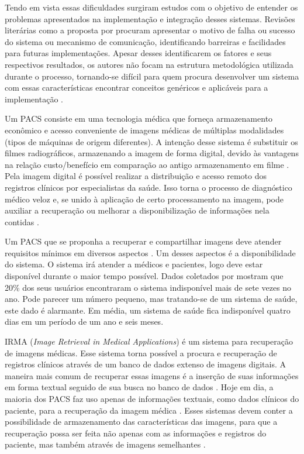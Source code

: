 Tendo em vista essas dificuldades surgiram estudos com o objetivo de entender os problemas apresentados na implementação e integração desses sistemas.
Revisões literárias como a proposta por \cite{REF02} procuram apresentar o motivo de falha ou sucesso do sistema ou mecanismo de comunicação, identificando barreiras e facilidades para futuras implementações.
Apesar desses identificarem os fatores e seus respectivos resultados, os autores não focam na estrutura metodológica utilizada durante o processo, tornando-se difícil para quem procura desenvolver um sistema com essas características encontrar conceitos genéricos e aplicáveis para a implementação \cite{REF09}.

Um PACS consiste em uma tecnologia médica que forneça armazenamento econômico e acesso conveniente de imagens médicas de múltiplas modalidades (tipos de máquinas de origem diferentes).
A intenção desse sistema é substituir os filmes radiográficos, armazenando a imagem de forma digital, devido às vantagens na relação custo/benefício em comparação ao antigo armazenamento em filme \cite{REF13}.
Pela imagem digital é possível realizar a distribuição e acesso remoto dos registros clínicos por especialistas da saúde.
Isso torna o processo de diagnóstico médico veloz e, se unido à aplicação de certo processamento na imagem, pode auxiliar a recuperação ou melhorar a disponibilização de informações nela contidas \cite{REF05}.

Um PACS que se proponha a recuperar e compartilhar imagens deve atender requisitos mínimos em diversos aspectos \cite{REF03}.
Um desses aspectos é a disponibilidade do sistema.
O sistema irá atender a médicos e pacientes, logo deve estar disponível durante o maior tempo possível.
Dados coletados por \cite{REF19} mostram que 20\% dos seus usuários encontraram o sistema indisponível mais de sete vezes no ano.
Pode parecer um número pequeno, mas tratando-se de um sistema de saúde, este dado é alarmante.
Em média, um sistema de saúde fica indisponível quatro dias em um período de um ano e seis meses.

IRMA (\textit{Image Retrieval in Medical Applications}) é um sistema para recuperação de imagens médicas. Esse sistema torna possível a procura e recuperação de registros clínicos através de um banco de dados extenso de imagens digitais.
A maneira mais comum de recuperar essas imagens é a inserção de suas informações em forma textual seguido de sua busca no banco de dados \cite{REF08}.
Hoje em dia, a maioria dos PACS faz uso apenas de informações textuais, como dados clínicos do paciente, para a recuperação da imagem médica \cite{REF04}.
Esses sistemas devem conter a possibilidade de armazenamento das características das imagens, para que a recuperação possa ser feita não apenas com as informações e registros do paciente, mas também através de imagens semelhantes \cite{REF10}.

